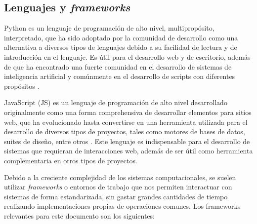 \subsection{Lenguajes y \textit{frameworks}}

Python es un lenguaje de programación de alto nivel, multipropósito, interpretado, que ha sido adoptado por la comunidad de desarrollo como una alternativa a diversos tipos de lenguajes debido a su facilidad de lectura y de introducción en el lenguaje. Es útil para el desarrollo web y de escritorio, además de que ha encontrado una fuerte comunidad en el desarrollo de sistemas de inteligencia artificial y comúnmente en el desarrollo de scripts con diferentes propósitos \cite{codecademy-python}.

JavaScript (JS) es un lenguaje de programación de alto nivel desarrollado originalmente como una forma comprehensiva de desarrollar elementos para sitios web, que ha evolucionado hasta convertirse en una herramienta utilizada para el desarrollo de diversos tipos de proyectos, tales como motores de bases de datos, suites de diseño, entre otros \cite{mozilla_javascript}. Este lenguaje es indispensable para el desarrollo de sistemas que requieran de interacciones web, además de ser útil como herramienta complementaria en otros tipos de proyectos.

Debido a la creciente complejidad de los sistemas computacionales, se suelen utilizar \textit{frameworks} o entornos de trabajo que nos permiten interactuar con sistemas de forma estandarizada, sin gastar grandes cantidades de tiempo realizando implementaciones propias de operaciones comunes. Los frameworks relevantes para este documento son los siguientes:

